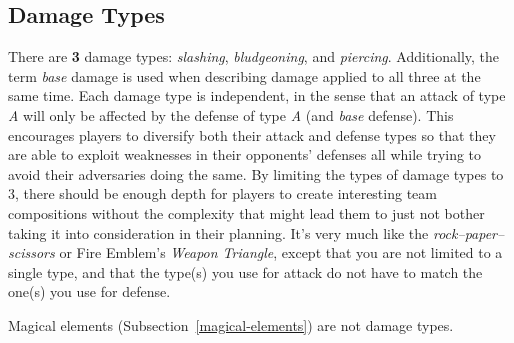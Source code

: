 \subsection{Damage Types}
\label{damage-types}
There are \textbf{3} damage types: \textit{slashing}, \textit{bludgeoning}, and
\textit{piercing}. Additionally, the term \textit{base} damage is used when
describing damage applied to all three at the same time. Each damage type is
independent, in the sense that an attack of type \textit{A} will only be
affected by the defense of type \textit{A} (and \textit{base} defense). This
encourages players to diversify both their attack and defense types so that they
are able to exploit weaknesses in their opponents' defenses all while trying to
avoid their adversaries doing the same. By limiting the types of damage types to
3, there should be enough depth for players to create interesting team
compositions without the complexity that might lead them to just not bother
taking it into consideration in their planning. It's very much like the
\textit{rock–paper–scissors} or Fire Emblem's \textit{Weapon Triangle}, except
that you are not limited to a single type, and that the type(s) you use for
attack do not have to match the one(s) you use for defense.

Magical elements (Subsection~\ref{magical-elements}) are not damage types.
